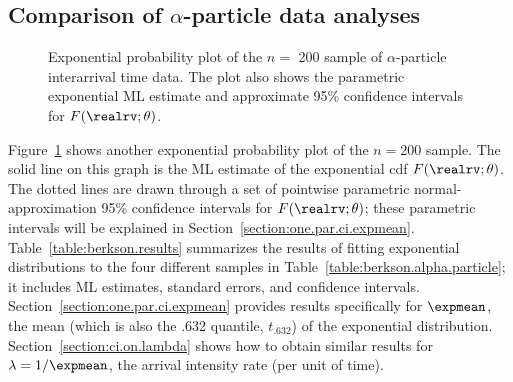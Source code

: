 \subsection{Comparison of 
$\alpha$-particle data analyses}
\begin{figure}
\caption{Exponential probability plot of
the $n = $ 200 sample of $\alpha$-particle interarrival time data. The
plot also shows the parametric exponential ML estimate and approximate
95\% confidence intervals for $F(\realrv;\theta)$.}
\label{figure:alpha.mlep.exp.ps}
\end{figure}
Figure~\ref{figure:alpha.mlep.exp.ps} shows another exponential
probability plot of the $n=200$ sample.  The solid line on this graph
is the ML estimate of the exponential cdf $F(\realrv;\theta)$.  The dotted
lines are drawn through a set of pointwise parametric
normal-approximation 95\% confidence 
intervals for $F(\realrv;\theta)$; these parametric intervals will be
explained in Section~\ref{section:one.par.ci.expmean}.
Table~\ref{table:berkson.results} summarizes the results of fitting
exponential distributions to the four different samples in
Table~\ref{table:berkson.alpha.particle}; it includes ML estimates,
standard errors, and confidence intervals.
Section~\ref{section:one.par.ci.expmean} provides results specifically
for $\expmean$, the mean (which is also the .632 quantile, $t_{.632}$) of the
exponential distribution.
Section~\ref{section:ci.on.lambda} shows how to obtain
similar results for $\lambda=1 / \expmean$, the arrival intensity rate
(per unit of time).
